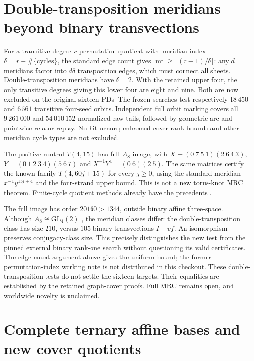 \documentclass[11pt]{article}
\newcommand{\mr}{\operatorname{mr}}
\begin{document}
\section{Double-transposition meridians beyond binary transvections}

For a transitive degree-$r$ permutation quotient with meridian
index $\delta=r-\#\{\text{cycles}\}$, the standard edge count gives
$\mr\ge\lceil(r-1)/\delta\rceil$: any $d$ meridians factor into
$d\delta$ transposition edges, which must connect all sheets.
Double-transposition meridians have $\delta=2$. With the retained
upper four, the only transitive degrees giving this lower four
are eight and nine. Both are now excluded on the original
sixteen PDs. The frozen searches test respectively $18\,450$
and $6\,561$ transitive four-seed orbits. Independent full
orbit marking covers all $9\,261\,000$ and $54\,010\,152$
normalized raw tails, followed by geometric arc and pointwise
relator replay. No hit occurs; enhanced cover-rank bounds and
other meridian cycle types are not excluded.

The positive control $T(4,15)$ has full $A_8$ image, with
$X=(0\ 7\ 5\ 1)(2\ 6\ 4\ 3)$,
$Y=(0\ 1\ 2\ 3\ 4)(5\ 6\ 7)$ and
$X^{-1}Y^4=(0\ 6)(2\ 5)$. The same matrices certify the known
family $T(4,60j+15)$ for every $j\ge0$, using the standard
meridian $x^{-1}y^{15j+4}$ and the four-strand upper bound.
This is not a new torus-knot MRC theorem. Finite-cycle quotient
methods already have the precedents \cite{bk,jp}.

The full image has order $20160>1344$, outside binary affine
three-space. Although $A_8\cong\mathrm{GL}_4(2)$ \cite{atlasa8},
the meridian classes differ: the double-transposition class
has size $210$, versus $105$ binary transvections $I+vf$.
An isomorphism preserves conjugacy-class size. This precisely
distinguishes the new test from the pinned external binary
rank-one search without questioning its valid certificates.
The edge-count argument above gives the uniform bound; the former
permutation-index working note is not distributed in this checkout.
These double-transposition tests do not settle the sixteen targets.
Their equalities are established by the retained graph-cover proofs.
Full MRC remains open, and worldwide novelty is unclaimed.

\section{Complete ternary affine bases and new cover quotients}
\end{document}
